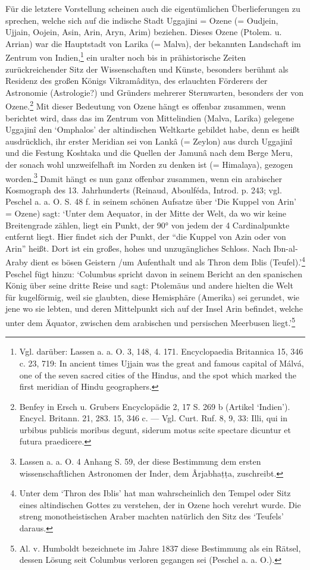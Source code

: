 \documentclass[a4paper, 11pt, oneside]{article}
\begin{document}
Für die letztere Vorstellung scheinen auch die eigentümlichen Überlieferungen zu sprechen, welche sich auf die indische Stadt Uggajini = Ozene (= Oudjein, Ujjain, Oojein, Asin, Arin, Aryn, Arim) beziehen. Dieses Ozene (Ptolem. u. Arrian) war die Hauptstadt von Larika (= Malva), der bekannten Landschaft im Zentrum von Indien,\footnote{Vgl. darüber: Lassen a. a. O. 3, 148, 4. 171. Encyclopaedia Britannica 15, 346 c. 23, 719: In ancient times Ujjain was the great and famous capital of Málvá, one of the seven sacred cities of the Hindus, and the spot which marked the first meridian of Hindu geographers.} ein uralter noch bis in prähistorische Zeiten zurückreichender Sitz der Wissenschaften und Künste, besonders berühmt als Residenz des großen Königs Vikramâditya, des erlauchten Förderers der Astronomie (Astrologie?) und Gründers mehrerer Sternwarten, besonders der von Ozene.\footnote{Benfey in Ersch u. Grubers Encyclopädie 2, 17 S. 269 b (Artikel `Indien'). Encycl. Britann. 21, 283. 15, 346 c. --- Vgl. Curt. Ruf. 8, 9, 33: Illi, qui in urbibus publicis moribus degunt, siderum motus scite spectare dicuntur et futura praedicere.} Mit dieser Bedeutung von Ozene hängt es offenbar zusammen, wenn berichtet wird, dass das im Zentrum von Mittelindien (Malva, Larika) gelegene Uggajinî den `Omphalos' der altindischen Weltkarte gebildet habe, denn es heißt ausdrücklich, ihr erster Meridian sei von Lankâ (= Zeylon) aus durch Uggajinî und die Festung Koshtaka und die Quellen der Jamunâ nach dem Berge Meru, der sonach wohl unzweifelhaft im Norden zu denken ist (= Himalaya), gezogen worden.\footnote{Lassen a. a. O. 4 Anhang S. 59, der diese Bestimmung dem ersten wissenschaftlichen Astronomen der Inder, dem Ârjabhaṭṭa, zuschreibt.} Damit hängt es nun ganz offenbar zusammen, wenn ein arabischer Kosmograph des 13. Jahrhunderts (Reinaud, Aboulféda, Introd. p. 243; vgl. Peschel a. a. O. S. 48 f. in seinem schönen Aufsatze über `Die Kuppel von Arin' = Ozene) sagt: `Unter dem Aequator, in der Mitte der Welt, da wo wir keine Breitengrade zählen, liegt ein Punkt, der 90° von jedem der 4 Cardinalpunkte entfernt liegt. Hier findet sich der Punkt, der "`die Kuppel von Azin oder von Arin"' heißt. Dort ist ein großes, hohes und unzugängliches Schloss. Nach Ibn-al-Araby dient es bösen Geistern /um Aufenthalt und als Thron dem Iblis (Teufel).'\footnote{Unter dem `Thron des Iblis' hat man wahrscheinlich den Tempel oder Sitz eines altindischen Gottes zu verstehen, der in Ozene hoch verehrt wurde. Die streng monotheistischen Araber machten natürlich den Sitz des `Teufels' daraus.} Peschel fügt hinzu: `Columbus spricht davon in seinem Bericht an den spanischen König über seine dritte Reise und sagt: Ptolemäus und andere hielten die Welt für kugelförmig, weil sie glaubten, diese Hemisphäre (Amerika) sei gerundet, wie jene wo sie lebten, und deren Mittelpunkt sich auf der Insel Arin befindet, welche unter dem Äquator, zwischen dem arabischen und persischen Meerbusen liegt.'\footnote{Al. v. Humboldt bezeichnete im Jahre 1837 diese Bestimmung als ein Rätsel, dessen Lösung seit Columbus verloren gegangen sei (Peschel a. a. O.).}
\end{document}
